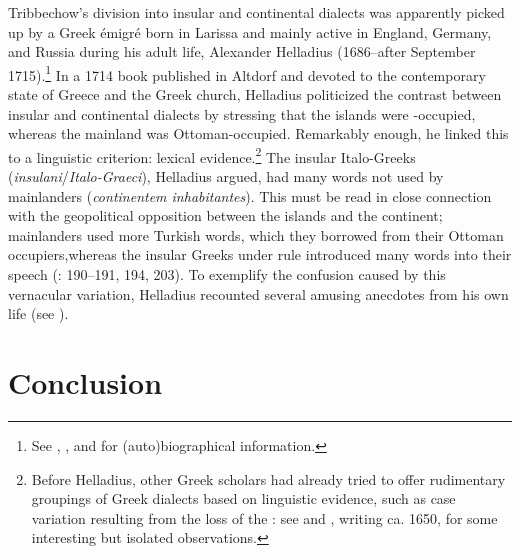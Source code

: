 Tribbechow’s division into insular and continental dialects was apparently picked up by a Greek émigré born in Larissa and mainly active in England, Germany, and Russia during his adult life, Alexander Helladius (1686–after September 1715).\footnote{See \citet{Helladius1714}, \citet[315--317]{Moennig1998}, and \citet{VanRooyFca} for (auto)biographical information.} In a 1714 book published in Altdorf and devoted to the contemporary state of Greece and the Greek church, Helladius politicized the contrast between insular and continental dialects by stressing that the islands were -oc\-cu\-pied, whereas the mainland was Ottoman-occupied. Remarkably enough, he linked this to a linguistic criterion: lexical evidence.\footnote{Before Helladius, other Greek scholars had already tried to offer rudimentary groupings of  Greek dialects based on linguistic evidence, such as case variation resulting from the loss of the : see \citet[108]{Kritopoulos1924} and \citet[e.g. 1 \& 8]{Nikiforos1908}, writing ca. 1650, for some interesting but isolated observations.} The insular Italo-Greeks (\textit{insulani}/\textit{Italo-Graeci}), Helladius argued, had many words not used by mainlanders (\textit{continentem inhabitantes}). This must be read in close connection with the geopolitical opposition between the islands and the continent; mainlanders used more Turkish words, which they borrowed from their Ottoman occupiers,\linebreak whereas the insular Greeks under  rule introduced many  words into their speech (\citealt{Helladius1714}: 190–191, 194, 203). To exemplify the confusion caused by this vernacular variation, Helladius recounted several amusing anecdotes from his own life (see \citet{VanRooyFca}).

\section{Conclusion}\label{sec:2.11}

